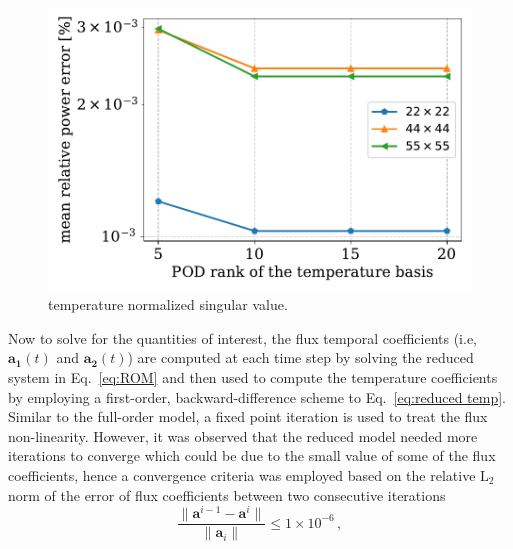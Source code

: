 \documentclass[]{interact}
\theoremstyle{plain}%
\theoremstyle{definition}
\theoremstyle{remark}
\begin{document}
\begin{figure}[H]
	\centering
	\includegraphics[width=1.0\linewidth]{../figures/temperature_rank_convergence.pdf}
	\caption{temperature normalized singular value.}
	\label{fig:temperature rank}
\end{figure}

Now to solve for the quantities of interest, the flux temporal coefficients (i.e, $\mathbf{a_1}(t)$ and $\mathbf{a_2}(t)$) are computed at each time step by solving the reduced system in Eq.~\ref{eq:ROM} and then used to compute the temperature coefficients by employing a first-order, backward-difference scheme to Eq.~\ref{eq:reduced temp}.
Similar to the full-order model, a fixed point iteration is used to treat the flux non-linearity.
However, it was observed that the reduced model needed more iterations to converge which could be due to the small value of some of the flux coefficients, hence a convergence criteria was employed based on the relative $\text{L}_2$ norm of the error of flux coefficients between two consecutive iterations 
\begin{equation}
	\frac{\|\mathbf{a}^{i-1} - \mathbf{a}^{i}\|}{\|\mathbf{a}_i \|} \le 1\times 10^{-6}  \, , 
\end{equation}
\end{document}
